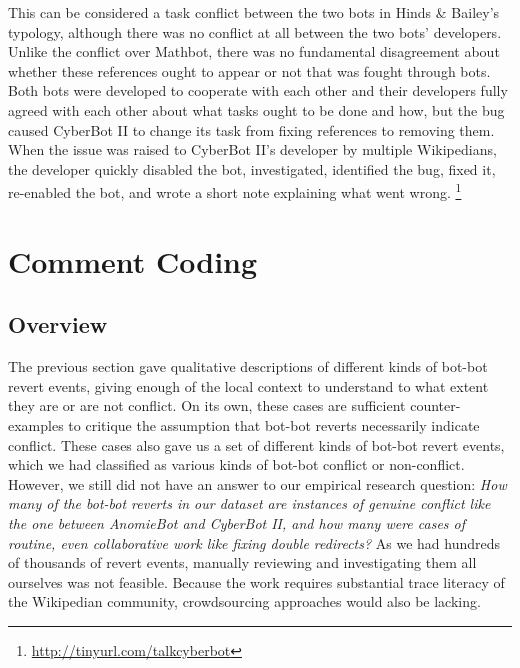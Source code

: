 \documentclass[format=acmsmall, review=false, screen=true]{acmart}%
\begin{document}
This can be considered a task conflict between the two bots in Hinds \& Bailey's typology, although there was no conflict at all between the two bots' developers. Unlike the conflict over Mathbot, there was no fundamental disagreement about whether these references ought to appear or not that was fought through bots. Both bots were developed to cooperate with each other and their developers fully agreed with each other about what tasks ought to be done and how, but the bug caused CyberBot II to change its task from fixing references to removing them. When the issue was raised to CyberBot II's developer by multiple Wikipedians, the developer quickly disabled the bot, investigated, identified the bug, fixed it, re-enabled the bot, and wrote a short note explaining what went wrong. \footnote{ \url{http://tinyurl.com/talkcyberbot}}

\section{Comment Coding} \label{s:coding}
\subsection{Overview} \label{s:coding:overview}
The previous section gave qualitative descriptions of different kinds of bot-bot revert events, giving enough of the local context to understand to what extent they are or are not conflict. On its own, these cases are sufficient counter-examples to critique the assumption that bot-bot reverts necessarily indicate conflict. These cases also gave us a set of different kinds of bot-bot revert events, which we had classified as various kinds of bot-bot conflict or non-conflict. However, we still did not have an answer to our empirical research question: \textit{How many of the bot-bot reverts in our dataset are instances of genuine conflict like the one between AnomieBot and CyberBot II, and how many were cases of routine, even collaborative work like fixing double redirects?} As we had hundreds of thousands of revert events, manually reviewing and investigating them all ourselves was not feasible. Because the work requires substantial trace literacy of the Wikipedian community, crowdsourcing approaches would also be lacking.
\end{document}
